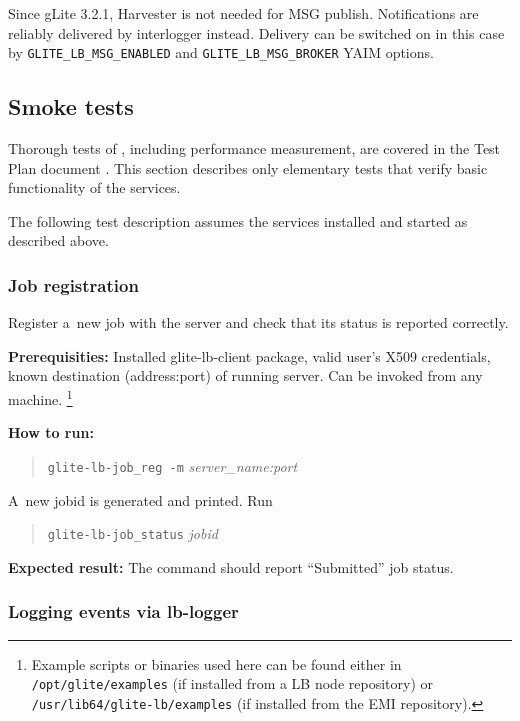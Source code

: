 Since gLite 3.2.1, \LB Harvester is not needed for MSG publish. Notifications are reliably delivered by interlogger instead. Delivery can be switched on in this case by \texttt{GLITE\_LB\_MSG\_ENABLED} and \texttt{GLITE\_LB\_MSG\_BROKER} YAIM options.

\subsection{Smoke tests}

Thorough tests of \LB, including performance measurement, are
covered in the \LB Test Plan document \cite{lbtp}.
This section describes only elementary tests that verify basic
functionality of the services.

The following test description assumes the \LB services installed
and started as described above.

\def\req{\noindent\textbf{Prerequisities:}\xspace}
\def\how{\noindent\textbf{How to run:}\xspace}
\def\result{\noindent\textbf{Expected result:}\xspace}

\subsubsection{Job registration}

Register a~new job with the \LB server and check that its status is
reported correctly.

\req Installed glite-lb-client package, valid user's X509 credentials,
known destination (address:port) of running \LB server.
Can be invoked from any machine. 
\footnote{Example scripts or binaries used here can be found either
in \texttt{/opt/glite/examples} (if installed from a LB node repository) or
\texttt{/usr/lib64/glite-lb/examples} (if installed from the EMI repository).} \setcounter{examplesfootnote}{\thefootnote}

\how 
\begin{quote}
\verb'glite-lb-job_reg -m' \emph{server\_name:port}
\end{quote}
A~new jobid is generated and printed.  Run 
\begin{quote}
\verb'glite-lb-job_status' \emph{jobid}
\end{quote}

\result
The command should report ``Submitted'' job status.

\subsubsection{Logging events via lb-logger}

